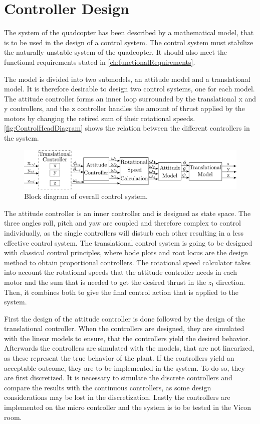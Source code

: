 \chapter{Controller Design}\label{chap:Control}
The system of the quadcopter has been described by a mathematical model, that is to be used in the design of a control system. The control system must stabilize the naturally unstable system of the quadcopter. It should also meet the functional requirements stated in \autoref{ch:functionalRequirements}.

The model is divided into two submodels, an attitude model and a translational model. It is therefore desirable to design two control systems, one for each model. The attitude controller forms an inner loop surrounded by the translational x and y controllers, and the z controller handles the amount of thrust applied by the motors by changing the retired sum of their rotational speeds. \autoref{fig:ControlHeadDiagram} shows the relation between the different controllers in the system.
\begin{figure}[H]
	\centering
	\includegraphics[width=1 \textwidth]{figures/generalcontroldiagram}
	\caption{Block diagram of overall control system.}
	\label{fig:ControlHeadDiagram}
\end{figure}

The attitude controller is an inner controller and is designed as state space. The three angles roll, pitch and yaw are coupled and therefore complex to control individually, as the single controllers will disturb each other resulting in a less effective control system. The translational control system is going to be designed with classical control principles, where bode plots and root locus are the design method to obtain proportional controllers. The rotational speed calculator takes into account the rotational speeds that the attitude controller needs in each motor and the sum that is needed to get the desired thrust in the $z_\mathrm{I}$ direction. Then, it combines both to give the final control action that is applied to the system.

First the design of the attitude controller is done followed by the design of the translational controller. 
When the controllers are designed, they are simulated with the linear models to ensure, that the controllers yield the desired behavior. Afterwards the controllers are simulated with the models, that are not linearized, as these represent the true behavior of the plant. If the controllers yield an acceptable outcome, they are to be implemented in the system. To do so, they are first discretized. It is necessary to simulate the discrete controllers and compare the results with the continuous controllers, as some design considerations may be lost in the discretization. Lastly the controllers are implemented on the micro controller and the system is to be tested in the Vicon room. 
